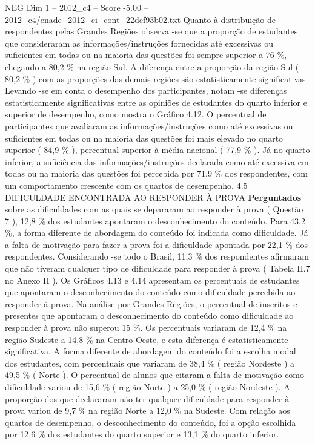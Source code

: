 \begin{textsample}{NEG Dim 1 – 2012\_c4 – Score -5.00 – 2012\_c4/enade\_2012\_ci\_cont\_22dcf93b02.txt}
Quanto à distribuição de respondentes pelas Grandes Regiões observa -se que a proporção de estudantes que consideraram as informações/instruções fornecidas até excessivas ou suficientes em todas ou na maioria das questões foi sempre superior a 76 \%, chegando a 80,2 \% na região Sul.
A diferença entre a proporção da região Sul ( 80,2 \% ) com as proporções das demais regiões são estatisticamente significativas.
Levando -se em conta o desempenho dos participantes, notam -se diferenças estatisticamente significativas entre as opiniões de estudantes do quarto inferior e superior de desempenho, como mostra o Gráfico 4.12.
O percentual de participantes que avaliaram as informações/instruções como até excessivas ou suficientes em todas ou na maioria das questões foi mais elevado no quarto superior ( 84,9 \% ), percentual superior à média nacional ( 77,9 \% ).
Já no quarto inferior, a suficiência das informações/instruções declarada como até excessiva em todas ou na maioria das questões foi percebida por 71,9 \% dos respondentes, com um comportamento crescente com os quartos de desempenho. 4.5 DIFICULDADE ENCONTRADA AO RESPONDER À PROVA \textbf{Perguntados} sobre as dificuldades com as quais se depararam ao responder à prova ( Questão 7 ), 12,8 \% dos estudantes apontaram o desconhecimento do conteúdo.
Para 43,2 \%, a forma diferente de abordagem do conteúdo foi indicada como dificuldade.
Já a falta de motivação para fazer a prova foi a dificuldade apontada por 22,1 \% dos respondentes.
Considerando -se todo o Brasil, 11,3 \% dos respondentes afirmaram que não tiveram qualquer tipo de dificuldade para responder à prova ( Tabela II.7 no Anexo II ).
Os Gráficos 4.13 e 4.14 apresentam os percentuais de estudantes que apontaram o desconhecimento do conteúdo como dificuldade percebida ao responder à prova.
Na análise por Grandes Regiões, o percentual de inscritos e presentes que apontaram o desconhecimento do conteúdo como dificuldade ao responder à prova não superou 15 \%.
Os percentuais variaram de 12,4 \% na região Sudeste a 14,8 \% na Centro-Oeste, e esta diferença é estatisticamente significativa.
A forma diferente de abordagem do conteúdo foi a escolha modal dos estudantes, com percentuais que variaram de 38,4 \% ( região Nordeste ) a 49,5 \% ( Norte ).
O percentual de alunos que citaram a falta de motivação como dificuldade variou de 15,6 \% ( região Norte ) a 25,0 \% ( região Nordeste ).
A proporção dos que declararam não ter qualquer dificuldade para responder à prova variou de 9,7 \% na região Norte a 12,0 \% na Sudeste.
Com relação aos quartos de desempenho, o desconhecimento do conteúdo, foi a opção escolhida por 12,6 \% dos estudantes do quarto superior e 13,1 \% do quarto inferior.

\end{textsample}
